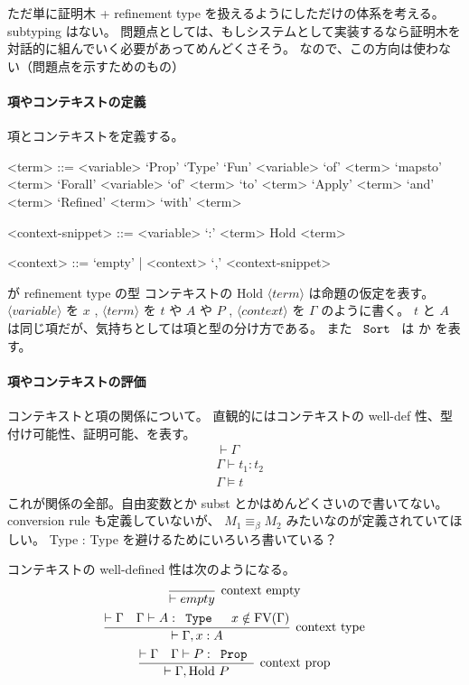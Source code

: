 ただ単に証明木 + refinement type を扱えるようにしただけの体系を考える。
subtyping はない。
問題点としては、もしシステムとして実装するなら証明木を対話的に組んでいく必要があってめんどくさそう。
なので、この方向は使わない（問題点を示すためのもの）

\paragraph*{項やコンテキストの定義}
項とコンテキストを定義する。

\begin{grammar}
<term> ::= <variable> 
\alt `Prop'
\alt `Type'
\alt `Fun' <variable> `of' <term> `mapsto' <term>
\alt `Forall' <variable> `of' <term> `to' <term>
\alt `Apply' <term> `and' <term>
\alt `Refined' <term> `with' <term>

<context-snippet> ::= <variable> `:' <term>
\alt Hold <term>

<context> ::= `empty' | <context> `,' <context-snippet>
\end{grammar}

 が refinement type の型
コンテキストの \(\text{Hold } \langle term \rangle\) は命題の仮定を表す。
\(\langle variable \rangle\) を \(x\) , \(\langle term \rangle\) を \(t\) や \(A\) や \(P\) , \(\langle context \rangle\) を \(\Gamma\) 
のように書く。
\(t\) と \(A\) は同じ項だが、気持ちとしては項と型の分け方である。
また \(\texttt{ Sort }\) は  か  を表す。

\paragraph*{項やコンテキストの評価}
コンテキストと項の関係について。
直観的にはコンテキストの well-def 性、型付け可能性、証明可能、を表す。
\begin{align*}
  &\vdash \Gamma \\
  &\Gamma \vdash t_1 : t_2 \\
  &\Gamma \vDash t \\
\end{align*}
これが関係の全部。自由変数とか subst とかはめんどくさいので書いてない。 conversion rule も定義していないが、 \(M_1 \equiv_{\beta} M_2\) みたいなのが定義されていてほしい。
Type : Type を避けるためにいろいろ書いている？

コンテキストの well-defined 性は次のようになる。
\begin{gather*}
  \infer[\text{context empty}]{\vdash empty}{} \\
  \infer[\text{context type}]{\vdash \Gamma , x : A}{\vdash \Gamma & \Gamma \vdash A : \prog{Type} & x \notin \text{FV}(\Gamma)} \\
  \infer[\text{context prop}]{\vdash \Gamma , \text{Hold } P}{\vdash \Gamma & \Gamma \vdash P : \prog{Prop}} \\
\end{gather*}

